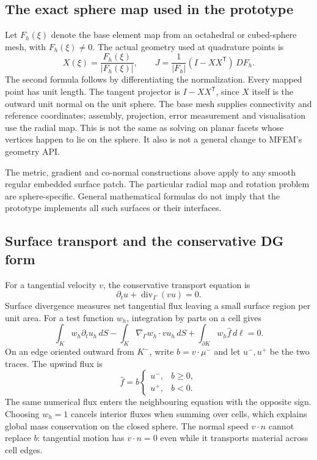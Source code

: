 \subsection{The exact sphere map used in the prototype}
Let $F_h(\xi)$ denote the base element map from an octahedral or cubed-sphere
mesh, with $F_h(\xi)\ne0$. The actual geometry used at quadrature points is
\begin{equation}
 X(\xi)=\frac{F_h(\xi)}{|F_h(\xi)|},\qquad
 J=\frac{1}{|F_h|}(I-XX^{\mathsf T})\,DF_h.
 \label{eq:app-radial-map}
\end{equation}
The second formula follows by differentiating the normalization. Every
mapped point has unit length. The tangent projector is $I-XX^{\mathsf T}$,
since $X$ itself is the outward unit normal on the unit sphere.
The base mesh supplies connectivity and reference coordinates; assembly,
projection, error measurement and visualisation use the radial map.
This is not the same as solving on planar facets whose vertices happen to
lie on the sphere. It also is not a general change to MFEM's geometry API.

The metric, gradient and co-normal constructions above apply to any smooth
regular embedded surface patch. The particular radial map and rotation
problem are sphere-specific. General mathematical formulas do not imply
that the prototype implements all such surfaces or their interfaces.

\subsection{Surface transport and the conservative DG form}
For a tangential velocity $v$, the conservative transport equation is
\begin{equation}
 \partial_t u+\operatorname{div}_\Gamma(vu)=0.
\end{equation}
Surface divergence measures net tangential flux leaving a small surface
region per unit area. For a test function $w_h$, integration by parts on
a cell gives
\begin{equation}
 \int_K w_h\partial_tu_h\,dS
 -\int_K \nabla_\Gamma w_h\cdot v u_h\,dS
 +\int_{\partial K}w_h\widehat f\,d\ell=0.
 \label{eq:app-surface-weak}
\end{equation}
On an edge oriented outward from $K^-$, write $b=v\cdot\mu^-$ and
let $u^-,u^+$ be the two traces. The upwind flux is
\begin{equation}
 \widehat f=b\begin{cases}u^-,&b\ge0,\\u^+,&b<0.\end{cases}
\end{equation}
The same numerical flux enters the neighbouring equation with the opposite
sign. Choosing $w_h=1$ cancels interior fluxes when summing over cells,
which explains global mass conservation on the closed sphere. The normal
speed $v\cdot n$ cannot replace $b$: tangential motion has $v\cdot n=0$
even while it transports material across cell edges.

